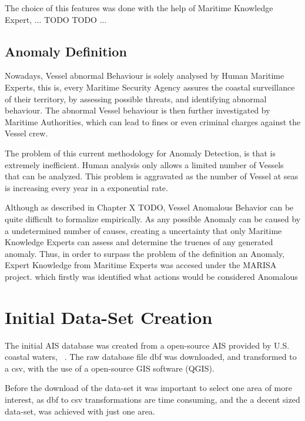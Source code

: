 The choice of this features was done with the help of Maritime Knowledge Expert, ... TODO TODO ...

\section{Anomaly Definition}
Nowadays, Vessel abnormal Behaviour is solely analysed by Human Maritime Experts, this is, every Maritime Security Agency assures the coastal surveillance of their territory, by assessing possible threats, and identifying abnormal behaviour. The abnormal Vessel behaviour is then further investigated by Maritime Authorities, which can lead to fines or even criminal charges against the Vessel crew. 

The problem of this current methodology for Anomaly Detection, is that is extremely inefficient. Human analysis only allows a limited number of Vessels that can be analyzed. This problem is aggravated as the number of Vessel at seas is increasing every year in a exponential rate. 

Although as described in Chapter X TODO, Vessel Anomalous Behavior can be quite difficult to formalize empirically. As any possible Anomaly can be caused by a undetermined number of causes, creating a uncertainty that only Maritime Knowledge Experts can assess and determine the truenes of any generated anomaly. Thus, in order to surpass the problem of the definition  an Anomaly, Expert Knowledge from Maritime Experts was accesed under the MARISA project. which firstly was identified what actions would be considered Anomalous 



\chapter{Initial Data-Set Creation} %

The initial AIS database was created from a open-source AIS provided by U.S. coastal waters, ~\cite{MarineCadastre}. The raw database file dbf was downloaded, and transformed to a csv, with the use of a open-source GIS software (QGIS). 
 
Before the download of the data-set it was important to select one area of more interest, as dbf to csv transformations are time consuming, and the a decent sized data-set, was achieved with just one area.

